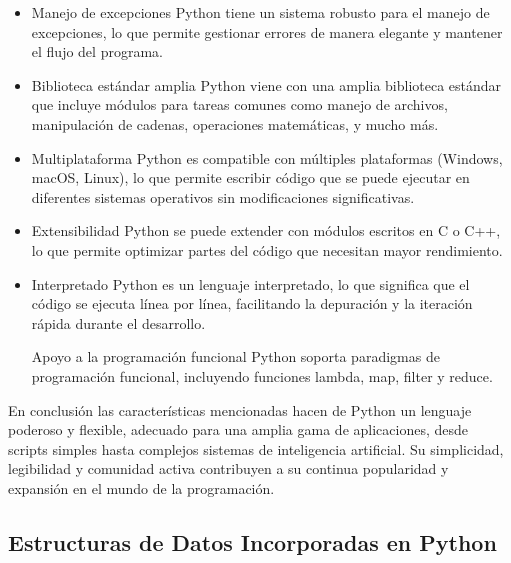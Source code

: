 \documentclass[10pt,a4paper]{article}
\begin{document}
\begin{itemize}
    \item Manejo de excepciones
Python tiene un sistema robusto para el manejo de excepciones, lo que permite gestionar errores de manera elegante y mantener el flujo del programa.

    \item Biblioteca estándar amplia
Python viene con una amplia biblioteca estándar que incluye módulos para tareas comunes como manejo de archivos, manipulación de cadenas, operaciones matemáticas, y mucho más.



    \item Multiplataforma
Python es compatible con múltiples plataformas (Windows, macOS, Linux), lo que permite escribir código que se puede ejecutar en diferentes sistemas operativos sin modificaciones significativas.

    \item Extensibilidad
Python se puede extender con módulos escritos en C o C++, lo que permite optimizar partes del código que necesitan mayor rendimiento.

    \item Interpretado
Python es un lenguaje interpretado, lo que significa que el código se ejecuta línea por línea, facilitando la depuración y la iteración rápida durante el desarrollo.

Apoyo a la programación funcional Python soporta paradigmas de programación funcional, incluyendo funciones lambda, map, filter y reduce.
\end{itemize}
En conclusión las características mencionadas hacen de Python un lenguaje poderoso y flexible, adecuado para una amplia gama de aplicaciones, desde scripts simples hasta complejos sistemas de inteligencia artificial. Su simplicidad, legibilidad y comunidad activa contribuyen a su continua popularidad y expansión en el mundo de la programación.
\subsection{Estructuras de Datos Incorporadas en Python}
\end{document}
